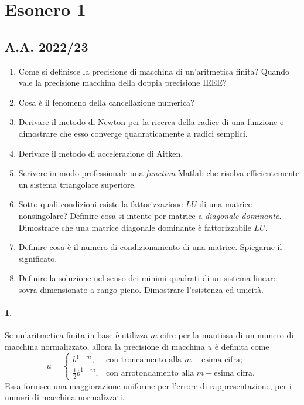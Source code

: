 \section{Esonero 1}
\subsection{A.A. 2022/23}
\begin{enumerate}
    \item Come si definisce la precisione di macchina di un'aritmetica finita? Quando vale la precisione macchina della doppia precisione IEEE?
    \item Cosa è il fenomeno della cancellazione numerica?
    \item Derivare il metodo di Newton per la ricerca della radice di una funzione e dimostrare che esso converge quadraticamente a radici semplici.
    \item Derivare il metodo di accelerazione di Aitken.
    \item Scrivere in modo professionale una \textit{function} Matlab che risolva efficientemente un sistema triangolare superiore.
    \item Sotto quali condizioni esiste la fattorizzazione $LU$ di una matrice nonsingolare? Definire cosa si intente per matrice a \textit{diagonale dominante}. Dimostrare che una matrice diagonale dominante è fattorizzabile $LU$.
    \item Definire cosa è il numero di condizionamento di una matrice. Spiegarne il significato.
    \item Definire la soluzione nel senso dei minimi quadrati di un sistema lineare sovra-dimensionato a rango pieno. Dimostrare l'esistenza ed unicità.
\end{enumerate}

\paragraph{1.} Se un'aritmetica finita in base $b$ utilizza $m$ cifre per la mantissa di un numero di macchina normalizzato, allora la precisione di macchina $u$ è definita come
\begin{equation*}
    u=
    \begin{cases}
        b^{1-m},& \text{con troncamento alla $m-$esima cifra;}\\
        \frac{1}{2}b^{1-m}, & \text{con arrotondamento alla $m-$esima cifra.}
    \end{cases}
\end{equation*}
Essa fornisce una maggiorazione uniforme per l'errore di rappresentazione, per i numeri di macchina normalizzati.

